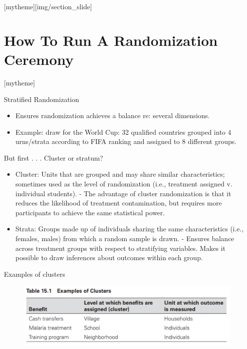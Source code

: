 \documentclass[aspectratio=169]{beamer}
\newcommand{\sectionpic}[2]{
	\setbeamertemplate{section page}[mytheme][#2]
	\section{#1}
	\setbeamertemplate{section page}[mytheme]
}
\begin{document}
\sectionpic{How To Run A Randomization Ceremony}{img/section_slide}

\begin{frame}{Stratified Randomization}

\begin{itemize}[<default overlay specification>]
	\item<1>  Ensures randomization achieves a balance re: several dimensions.
	\item<1>  Example: draw for the World Cup: 32 qualified countries grouped into 4 urns/strata  according to FIFA ranking and assigned to 8 different groups.
\end{itemize}

\end{frame}


\begin{frame}{But first . . . Cluster or stratum?}
\begin{multicols}{2}	
	
	\begin{itemize}[<default overlay specification>]
		\item<1>  Cluster: Units that are grouped and may share similar characteristics; sometimes used as the level of randomization (i.e., treatment assigned v. individual students).
			\newline - The advantage of cluster randomization is that it reduces the likelihood of treatment contamination, but requires more participants to achieve the same statistical power.

		\item<1>  Strata: Groups made up of individuals sharing the same characteristics (i.e., females, males) from which a random sample is drawn.
			\newline - Ensures balance across treatment groups with respect to stratifying variables. Makes it possible to draw inferences about outcomes within each group.
	\end{itemize}
	
\end{multicols}
\end{frame}


\begin{frame}{Examples of clusters}

\begin{figure}
	\centering
	\includegraphics[width=\linewidth]{img/Clusters}
\end{figure}

\end{frame}
\end{document}
